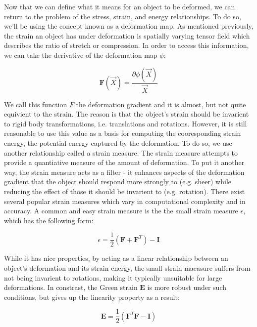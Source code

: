 \documentclass[12pt,oneside,letterpaper]{memoir}
\begin{document}
Now that we can define what it means for an object to be deformed, we
can return to the problem of the stress, strain, and energy
relationships. To do so, we'll be using the concept known as a
deformation map. As mentioned previously, the strain an object has
under deformation is spatially varying tensor field which describes
the ratio of stretch or compression. In order to access this information,
we can take the derivative of the deformation map $\phi$:

\begin{equation}
  \label{equ:deformationgradient}
  \mathbf{F}(\vec{X}) = \frac{\partial \phi(
      \vec{X} )}{ \vec{X} }
\end{equation}

We call this function $F$ the deformation gradient and it is almost,
but not quite equivient to the strain. The reason is that the object's
strain should be invarient to rigid body transformations,
i.e. translations and rotations. However, it is still reasonable to
use this value as a basis for computing the cooresponding strain
energy, the potential energy captured by the deformation. To do so, we
use another relationship called a strain measure. The strain measure
attempts to provide a quantiative measure of the amount of
deformation. To put it another way, the strain measure acts as a
filter - it enhances aspects of the deformation gradient that the
object should respond more strongly to (e.g. sheer) while reducing the
effect of those it should be invarient to (e.g. rotation). There exist
several popular strain measures which vary in computational complexity
and in accuracy. A common and easy strain measure is the the small
strain measure $\epsilon$, which has the following form:

\begin{equation}
  \label{equ:smallstrain}
  \epsilon = \frac 1 2 (\mathbf{F} + \mathbf{F}^T) - \mathbf{I}
\end{equation}

While it has nice properties, by acting as a linear
relationship between an object's deformation and its strain energy, the small
strain maeasure suffers from not being invarient to rotations,
making it typically unsuitable for large deformations. In constrast,
the Green strain $\mathbf{E}$ is more robust under such conditions,
but gives up the linearity property as a result:

\begin{equation}
  \label{equ:greenstrain}
  \mathbf{E} = \frac 1 2 (\mathbf{F}^T\mathbf{F}-\mathbf{I})
\end{equation}
  
\end{document}
